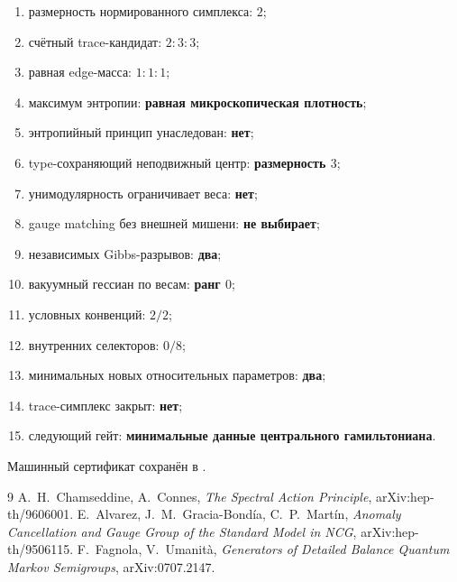 \begin{protocol}\begin{enumerate}
\item размерность нормированного симплекса: \textbf{$2$};
\item счётный trace-кандидат: \textbf{$2:3:3$};
\item равная edge-масса: \textbf{$1:1:1$};
\item максимум энтропии: \textbf{равная микроскопическая плотность};
\item энтропийный принцип унаследован: \textbf{нет};
\item type-сохраняющий неподвижный центр: \textbf{размерность $3$};
\item унимодулярность ограничивает веса: \textbf{нет};
\item gauge matching без внешней мишени: \textbf{не выбирает};
\item независимых Gibbs-разрывов: \textbf{два};
\item вакуумный гессиан по весам: \textbf{ранг $0$};
\item условных конвенций: \textbf{$2/2$};
\item внутренних селекторов: \textbf{$0/8$};
\item минимальных новых относительных параметров: \textbf{два};
\item trace-симплекс закрыт: \textbf{нет};
\item следующий гейт: \textbf{минимальные данные центрального гамильтониана}.
\end{enumerate}\end{protocol}

Машинный сертификат сохранён в
.

\begin{thebibliography}{9}
A.~H.~Chamseddine, A.~Connes,
\emph{The Spectral Action Principle}, arXiv:hep-th/9606001.
E.~Alvarez, J.~M.~Gracia-Bond\'ia, C.~P.~Mart\'in,
\emph{Anomaly Cancellation and Gauge Group of the Standard Model in NCG},
arXiv:hep-th/9506115.
F.~Fagnola, V.~Umanit\`a,
\emph{Generators of Detailed Balance Quantum Markov Semigroups},
arXiv:0707.2147.
\end{thebibliography}